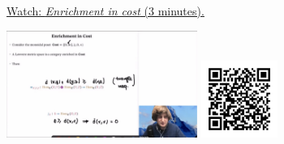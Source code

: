 
\begin{minipage}{10cm}
    \href{https://act4e-spring21.netlify.app/videos/spring2021-enrichment:cost-en.html}{Watch: \emph{Enrichment in cost} (3 minutes).}
        
    \href{https://act4e-spring21.netlify.app/videos/spring2021-enrichment:cost-en.html}{\includegraphics[height=3.5cm]{spring2021-enrichment:cost-en/thumbnails.jpg}}
    \href{https://act4e-spring21.netlify.app/videos/spring2021-enrichment:cost-en.html}{\includegraphics[height=2.5cm]{spring2021-enrichment:cost-en/qrcode.png}}
\end{minipage}
